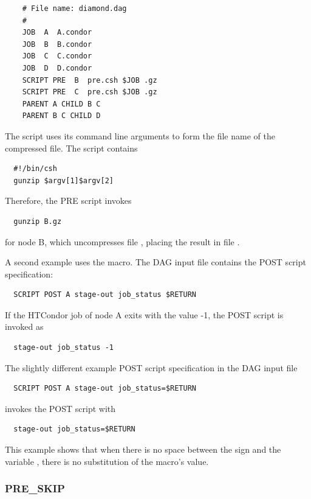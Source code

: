 \footnotesize
\begin{verbatim}
    # File name: diamond.dag
    #
    JOB  A  A.condor 
    JOB  B  B.condor 
    JOB  C  C.condor	
    JOB  D  D.condor
    SCRIPT PRE  B  pre.csh $JOB .gz
    SCRIPT PRE  C  pre.csh $JOB .gz
    PARENT A CHILD B C
    PARENT B C CHILD D
\end{verbatim}
\normalsize

The script  uses its command line arguments to form the file name
of the compressed file.
The script contains

\begin{verbatim}
  #!/bin/csh
  gunzip $argv[1]$argv[2]
\end{verbatim}

Therefore, the PRE script invokes  
\begin{verbatim}
  gunzip B.gz
\end{verbatim}
for node B, which uncompresses file ,
placing the result in file .

A second example uses the  macro.
The DAG input file contains the POST script specification:
\begin{verbatim}
  SCRIPT POST A stage-out job_status $RETURN 
\end{verbatim}
If the HTCondor job of node A exits with the value -1,
the POST script is invoked as
\begin{verbatim}
  stage-out job_status -1
\end{verbatim}

The slightly different example POST script specification
in the DAG input file
\begin{verbatim}
  SCRIPT POST A stage-out job_status=$RETURN 
\end{verbatim}
invokes the POST script with
\begin{verbatim}
  stage-out job_status=$RETURN
\end{verbatim}

This example shows that when
there is no space between the \Expr{=} sign and the variable ,
there is no substitution of the macro's value.

\subsubsection{\label{sec:dagman_pre_skip_command}PRE\_SKIP}
\label{dagman:PRE-SKIP}

